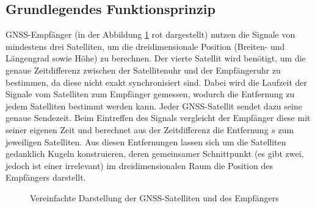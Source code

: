 \subsection{Grundlegendes Funktionsprinzip}
\label{subsec:gnss_funktionsprinzip}
GNSS-Empfänger (in der Abbildung \ref{fig:gnss_simplified} rot dargestellt) nutzen die Signale von mindestens drei Satelliten, um die dreidimensionale Position (Breiten- und Längengrad sowie Höhe) zu berechnen. Der vierte Satellit wird benötigt, um die genaue Zeitdifferenz zwischen der Satellitenuhr und der Empfängeruhr zu bestimmen, da diese nicht exakt synchronisiert sind. Dabei wird die Laufzeit der Signale vom Satelliten zum Empfänger gemessen, wodurch die Entfernung zu jedem Satelliten bestimmt werden kann.
Jeder GNSS-Satellit sendet dazu seine genaue Sendezeit. Beim Eintreffen des Signals vergleicht der Empfänger diese mit seiner eigenen Zeit und berechnet aus der Zeitdifferenz die Entfernung $s$ zum jeweiligen Satelliten.
Aus diesen Entfernungen lassen sich um die Satelliten gedanklich Kugeln konstruieren, deren gemeinsamer Schnittpunkt (es gibt zwei, jedoch ist einer irrelevant) im dreidimensionalen Raum die Position des Empfängers darstellt.
\\

\begin{figure}[H]
    \centering
{}
    \caption{Vereinfachte Darstellung der GNSS-Satelliten und des Empfängers}
    \label{fig:gnss_simplified}
\end{figure}
\newpage
